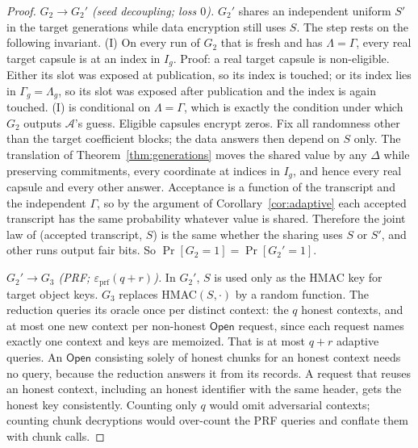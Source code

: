 \documentclass[pdflatex,sn-mathphys-num]{sn-jnl}%
\theoremstyle{plain}
\theoremstyle{definition}
\begin{document}
\begin{proof}
\emph{$G_2\to G_2'$ (seed decoupling; loss $0$).} $G_2'$ shares an independent uniform $S'$ in the target generations while data encryption still uses $S$. The step rests on the following invariant. (I) On every run of $G_2$ that is fresh and has $\Lambda=\Gamma$, every real target capsule is at an index in $I_g$. Proof: a real target capsule is non-eligible. Either its slot was exposed at publication, so its index is touched; or its index lies in $\Gamma_g=\Lambda_g$, so its slot was exposed after publication and the index is again touched. (I) is conditional on $\Lambda=\Gamma$, which is exactly the condition under which $G_2$ outputs $\mathcal A$'s guess. Eligible capsules encrypt zeros. Fix all randomness other than the target coefficient blocks; the data answers then depend on $S$ only. The translation of Theorem~\ref{thm:generations} moves the shared value by any $\Delta$ while preserving commitments, every coordinate at indices in $I_g$, and hence every real capsule and every other answer. Acceptance is a function of the transcript and the independent $\Gamma$, so by the argument of Corollary~\ref{cor:adaptive} each accepted transcript has the same probability whatever value is shared. Therefore the joint law of (accepted transcript, $S$) is the same whether the sharing uses $S$ or $S'$, and other runs output fair bits. So $\Pr[G_2=1]=\Pr[G_2'=1]$.

\emph{$G_2'\to G_3$ (PRF; $\varepsilon_{\mathrm{prf}}(q+r)$).} In $G_2'$, $S$ is used only as the HMAC key for target object keys. $G_3$ replaces HMAC$(S,\cdot)$ by a random function. The reduction queries its oracle once per distinct context: the $q$ honest contexts, and at most one new context per non-honest $\mathsf{Open}$ request, since each request names exactly one context and keys are memoized. That is at most $q+r$ adaptive queries. An $\mathsf{Open}$ consisting solely of honest chunks for an honest context needs no query, because the reduction answers it from its records. A request that reuses an honest context, including an honest identifier with the same header, gets the honest key consistently. Counting only $q$ would omit adversarial contexts; counting chunk decryptions would over-count the PRF queries and conflate them with chunk calls.


\end{proof}
\end{document}
